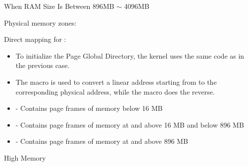 \begin{frame}{When RAM Size Is Between 896MB $\sim$ 4096MB}
  \begin{description}
  \item[Physical memory zones:]
  \end{description}
  \begin{center}
     
  \end{center}
  \begin{description}
  \item[Direct mapping for :]
  \end{description}
  \begin{center}
     
  \end{center}
\end{frame}

\begin{itemize}
\item To initialize the Page Global Directory, the kernel uses the same code as in the
  previous case.
\item The  macro is used to convert a linear address starting from
   to the corresponding physical address, while the  macro
  does the reverse.
\item {} - Contains page frames of memory below 16 MB
\item {} - Contains page frames of memory at and above 16 MB and below
  896 MB
\item {} - Contains page frames of memory at and above 896 MB
\end{itemize}

\begin{frame}{High Memory}
  \begin{center}
  \end{center}
\end{frame}

